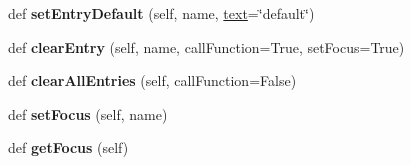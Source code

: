 \begin{DoxyCompactItemize}
\mbox{\label{class_python_01_g_u_i_1_1appjar_1_1gui_a14b31221337d8c4a4b64f829015a2cca}} 
def {\bfseries set\+Entry\+Default} (self, name, \hyperlink{class_python_01_g_u_i_1_1appjar_1_1gui_a6a060ddfec169e464326a0dd179a559e}{text}=\char`\"{}default\char`\"{})
\item 
\mbox{\label{class_python_01_g_u_i_1_1appjar_1_1gui_ad3d76ae885bb37e92b3e0b4679ff11fa}} 
def {\bfseries clear\+Entry} (self, name, call\+Function=True, set\+Focus=True)
\item 
\mbox{\label{class_python_01_g_u_i_1_1appjar_1_1gui_ac27f5ec4496160d64319d4442f8cf194}} 
def {\bfseries clear\+All\+Entries} (self, call\+Function=False)
\item 
\mbox{\label{class_python_01_g_u_i_1_1appjar_1_1gui_a0179f6827919217fc7a9d47a4dc02d11}} 
def {\bfseries set\+Focus} (self, name)
\item 
\mbox{\label{class_python_01_g_u_i_1_1appjar_1_1gui_a67fb2b07bea3e1331b8e09838232892e}} 
def {\bfseries get\+Focus} (self)
\end{DoxyCompactItemize}
